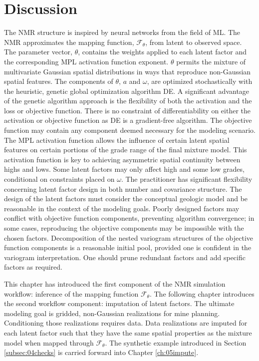 \FloatBarrier
\section{Discussion}
\label{sec:04discuss}

The \gls{NMR} structure is inspired by neural networks from the field of \gls{ML}. The \gls{NMR} approximates the mapping function, $\mathcal{F}_{\theta}$, from latent to observed space. The parameter vector, $\theta$, contains the weights applied to each latent factor and the corresponding \gls{MPL} activation function exponent. $\theta$ permits the mixture of multivariate Gaussian spatial distributions in ways that reproduce non-Gaussian spatial features. The components of $\theta$, $a$ and $\omega$, are optimized stochastically with the heuristic, genetic global optimization algorithm \gls{DE}. A significant advantage of the genetic algorithm approach is the flexibility of both the activation and the loss or objective function. There is no constraint of differentiability on either the activation or objective function as \Gls{DE} is a gradient-free algorithm. The objective function may contain any component deemed necessary for the modeling scenario. The \gls{MPL} activation function allows the influence of certain latent spatial features on certain portions of the grade range of the final mixture model. This activation function is key to achieving asymmetric spatial continuity between highs and lows. Some latent factors may only affect high and some low grades, conditional on constraints placed on $\omega$. The practitioner has significant flexibility concerning latent factor design in both number and covariance structure. The design of the latent factors must consider the conceptual geologic model and be reasonable in the context of the modeling goals. Poorly designed factors may conflict with objective function components, preventing algorithm convergence; in some cases, reproducing the objective components may be impossible with the chosen factors. Decomposition of the nested variogram structures of the objective function components is a reasonable initial pool, provided one is confident in the variogram interpretation. One should prune redundant factors and add specific factors as required.

This chapter has introduced the first component of the \gls{NMR} simulation workflow: inference of the mapping function $\mathcal{F}_{\theta}$. The following chapter introduces the second workflow component: imputation of latent factors. The ultimate modeling goal is gridded, non-Gaussian realizations for mine planning. Conditioning those realizations requires data. Data realizations are imputed for each latent factor such that they have the same spatial properties as the mixture model when mapped through $\mathcal{F}_{\theta}$. The synthetic example introduced in Section \ref{subsec:04checks} is carried forward into Chapter \ref{ch:05impute}.